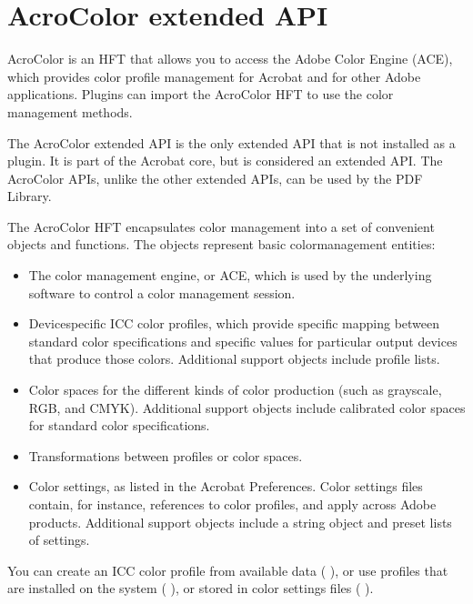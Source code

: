 \documentclass[letterpaper,12pt,english,openany,oneside]{sphinxmanual}
\begin{document}
\section{AcroColor extended API}
\label{\detokenize{Plugins_ExtendedAPI:acrocolor-extended-api}}
AcroColor is an HFT that allows you to access the Adobe Color Engine (ACE), which provides color profile management for Acrobat and for other Adobe applications. Plugins can import the AcroColor HFT to use the color management methods.

The AcroColor extended API is the only extended API that is not installed as a plugin. It is part of the Acrobat core, but is considered an extended API. The AcroColor APIs, unlike the other extended APIs, can be used by the PDF Library.

The AcroColor HFT encapsulates color management into a set of convenient objects and functions. The objects represent basic color\sphinxhyphen{}management entities:
\begin{itemize}
\item {} 
The color management engine, or ACE, which is used by the underlying software to control a color management session.

\item {} 
Device\sphinxhyphen{}specific ICC color profiles, which provide specific mapping between standard color specifications and specific values for particular output devices that produce those colors. Additional support objects include profile lists.

\item {} 
Color spaces for the different kinds of color production (such as grayscale, RGB, and CMYK). Additional support objects include calibrated color spaces for standard color specifications.

\item {} 
Transformations between profiles or color spaces.

\item {} 
Color settings, as listed in the Acrobat Preferences. Color settings files contain, for instance, references to color profiles, and apply across Adobe products. Additional support objects include a string object and preset lists of settings.

\end{itemize}

You can create an ICC color profile from available data ( ), or use profiles that are installed on the system ( ), or stored in color settings files ( ).
\end{document}
